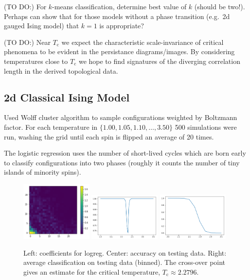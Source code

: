 \documentclass[11pt]{article}
\begin{document}
(TO DO:) For $k$-means classification, determine best value of $k$ (should be two!). Perhaps can show that for those models without a phase transition (e.g.~2d gauged Ising model) that $k=1$ is appropriate?

(TO DO:) Near $T_\text{c}$ we expect the characteristic scale-invariance of critical phenomena to be evident in the persistance diagrams/images. By considering temperatures close to $T_\text{c}$ we hope to find signatures of the diverging correlation length in the derived topological data.


\subsection{2d Classical Ising Model}
Used Wolff cluster algorithm to sample configurations weighted by Boltzmann factor. For each temperature in $\{1.00,1.05,1.10,\ldots,3.50\}$ 500 simulations were run, washing the grid until each spin is flipped an average of 20 times.

The logistic regression uses the number of short-lived cycles which are born early to classify configurations into two phases (roughly it counts the number of tiny islands of minority spins).

\begin{figure}[h]
    \centering
    \includegraphics[width=0.32\textwidth]{logreg_2d_ising}
    \includegraphics[width=0.32\textwidth]{logreg_acc_2d_ising}
    \includegraphics[width=0.32\textwidth]{logreg_avg_2d_ising}
    \caption{Left: coefficients for logreg. Center: accuracy on testing data. Right: average classification on testing data (binned). The cross-over point gives an estimate for the critical temperature, $T_\text{c}\approx 2.2796$.}
\end{figure}
\end{document}
